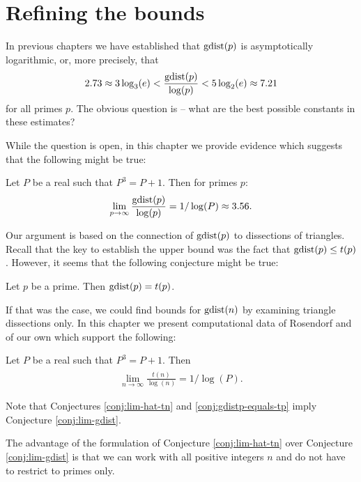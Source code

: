 \chapter{Refining the bounds}
\label{chap:bounds}

In previous chapters we have established that $\mathop{\mathrm{gdist}}(p)$ is asymptotically logarithmic, or, more precisely, that
\begin{align}
	2.73 \approx 3 \log_3(e) < \frac{\mathop{\mathrm{gdist}}(p)}{\log(p)} < 5 \log_2(e) \approx 7.21
\end{align}
for all primes $p$. The obvious question is -- what are the best possible constants in these estimates?

While the question is open, in this chapter we provide evidence which suggests that the following might be true:

\begin{conj}
\label{conj:lim-gdist}
Let $P$ be a real such that $P^3=P+1$. Then for primes $p$:
\begin{align}
	\lim_{p \rightarrow \infty} \frac{\mathop{\mathrm{gdist}}(p)}{\log(p)} = 1/\log(P) \approx 3.56.
\end{align}
\end{conj}%

Our argument is based on the connection of $\mathop{\mathrm{gdist}}(p)$ to dissections of triangles. Recall that the key to establish the upper bound was the fact that $\mathop{\mathrm{gdist}}(p) \leq t(p)$. However, it seems that the following conjecture might be true:

\begin{conj}
\label{conj:gdistp-equals-tp}
Let $p$ be a prime. Then $\mathop{\mathrm{gdist}}(p) = t(p)$.
\end{conj}%

If that was the case, we could find bounds for $\mathop{\mathrm{gdist}}(n)$ by examining triangle dissections only. In this chapter we present computational data of Rosendorf \cite{Rosendorf04} and of our own which support the following:

\begin{conj}
\label{conj:lim-hat-tn}
Let $P$ be a real such that $P^3=P+1$. Then
\begin{align}
	\lim_{n \rightarrow \infty} \frac{\hat t(n)}{\log(n)} = 1/\log(P).
\end{align}
\end{conj}%

Note that Conjectures \ref{conj:lim-hat-tn} and \ref{conj:gdistp-equals-tp} imply Conjecture \ref{conj:lim-gdist}.

The advantage of the formulation of Conjecture \ref{conj:lim-hat-tn} over Conjecture \ref{conj:lim-gdist} is that we can work with all positive integers $n$ and do not have to restrict to primes only.

